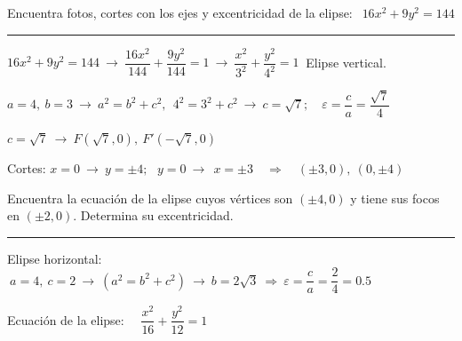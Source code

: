 \vspace{4mm}
\begin{miejercicio}

Encuentra fotos, cortes con los ejes y excentricidad de la elipse: $\ \ 16x^2+9y^2=144$

\rule{250pt}{0.1pt}

\vspace{2mm} $16x^2+9y^2=144 \ \to \ \dfrac{16x^2}{144}+\dfrac{9y^2}{144}=1 \ \to \ \dfrac{x^2}{3^2}+\dfrac{y^2}{4^2}=1\ $ Elipse vertical.

\vspace{2mm} $a=4,\ b=3  \ \to \ a^2=b^2+c^2,\ \ 4^2=3^2+c^2 \ \to \ c=\sqrt{7};\quad \varepsilon=\dfrac c a = \dfrac{\sqrt{7}}{4}$

\vspace{2mm} $c=\sqrt{7} \ \to \ F(\sqrt{7},0), \  F'(-\sqrt{7},0)$

\vspace{2mm} Cortes: $ x=0\ \to \ y=\pm 4;\ \ \ y=0 \ \to \ \ x=\pm 3 \quad \Rightarrow \quad (\pm 3,0),\ (0,\pm 4)$
	
\end{miejercicio}

\vspace{4mm}
\begin{miejercicio}

Encuentra la ecuación de la elipse cuyos vértices son $(\pm 4,0)$ y tiene sus focos en $(\pm 2,0)$. Determina su excentricidad.

\rule{250pt}{0.1pt}

\vspace{2mm} Elipse horizontal: $\ a=4,\ c=2 \ \to \ (a^2=b^2+c^2) \ \to \ b=2\sqrt{3} \ \Rightarrow \ \varepsilon=\dfrac c a=\dfrac 2 4=0.5$

\vspace{2mm} Ecuación de la elipse: $\quad \dfrac{x^2}{16}+\dfrac{y^2}{12}=1$
	
\end{miejercicio}

